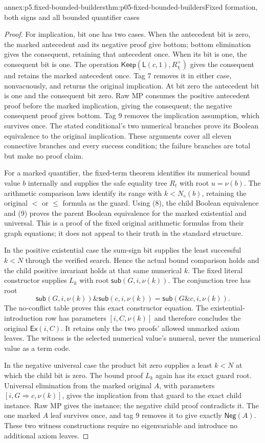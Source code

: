 \begin{annexitem}{annex:p5.fixed-bounded-builders}{thm:p05-fixed-bounded-builders}{Fixed formation, both signs and all bounded quantifier cases}
\begin{proof}
For implication, bit one has two cases. When the antecedent bit is
zero, the marked antecedent and its negative proof give bottom;
bottom elimination gives the consequent, retaining that antecedent
once. When its bit is one, the consequent bit is one. The operation
\(\mathsf{Keep}(\mathsf L(c,1),R_\chi^+)\) gives the consequent
and retains the marked antecedent once. Tag 7 removes it in either
case, nonvacuously, and returns the original implication. At bit zero
the antecedent bit is one and the consequent bit zero. Raw MP consumes
the positive antecedent proof before the marked implication, giving
the consequent; the negative consequent proof gives bottom. Tag 9
removes the implication assumption, which survives once. The stated
conditional's two numerical branches prove its Boolean equivalence
to the original implication. These arguments cover all eleven connective
branches and every success condition; the failure
branches are total but make no proof claim.

For a marked quantifier, the fixed-term theorem identifies its numerical
bound value \(b\) internally and supplies the safe equality tree
\(R_t\) with root \(u=\nu(b)\). The arithmetic comparison laws
identify its range with \(k<N_\diamond(b)\), retaining the
original \(<\) or \(\leq\) formula as the guard. Using (8), the
child Boolean equivalence and (9) proves the parent Boolean equivalence
for the marked existential and universal. This is a proof of the
fixed original arithmetic formulas from their graph equations; it
does not appeal to their truth in the standard structure.

In the positive existential case the sum-sign bit supplies the least
successful \(k<N\) through the verified search. Hence the actual
bound comparison holds and the child positive invariant holds at that
same numerical \(k\). The fixed literal constructor supplies
\(L_k\) with root \(\mathsf{sub}(G,i,\nu(k))\). The conjunction
tree has root
\[
 \mathsf{sub}(G,i,\nu(k))\mathbin{\&}\mathsf{sub}(c,i,\nu(k))
               =\mathsf{sub}(G\mathbin{\&}c,i,\nu(k)).
\tag{10}
\]
The no-conflict table proves this exact constructor equation. The
existential-introduction row has parameters \([i,C,\nu(k)]\) and
therefore concludes the original \(\mathsf{Ex}(i,C)\). It retains
only the two proofs' allowed unmarked axiom leaves. The witness is
the selected numerical value's numeral, never the numerical value as
a term code.

In the negative universal case the product bit zero supplies a least
\(k<N\) at which the child bit is zero. The bound proof \(L_k\)
again has its exact guard root. Universal elimination from the marked
original \(A\), with parameters \([i,G\Rightarrow c,\nu(k)]\),
gives the implication from that guard to the exact child instance.
Raw MP gives the instance; the negative child proof contradicts it.
The one marked \(A\) leaf survives once, and tag 9 removes it to
give exactly \(\mathsf{Neg}(A)\). These two witness constructions
require no eigenvariable and introduce no additional axiom leaves.


\end{proof}
\end{annexitem}
